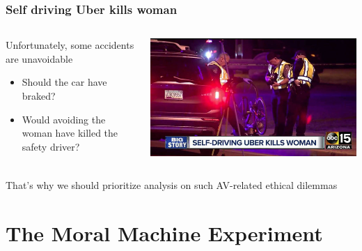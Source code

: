\documentclass[aspectratio=169]{beamer}
\begin{document}
\begin{frame}
    \frametitle{Self driving Uber kills woman}
    \begin{columns}[totalwidth=1.0\textwidth]
        \begin{column}{0.5\textwidth}
            Unfortunately, some accidents are unavoidable
            \begin{itemize}
                \item Should the car have braked?
                \item Would avoiding the woman have killed the safety driver?
            \end{itemize}
        \end{column}
        \begin{column}{0.45\textwidth}
            \includegraphics[width=1.0\linewidth]{assets/death-of-Elaine-Herzberg.jpg}
        \end{column}
    \end{columns}
    \bigskip
    \begin{center}
        That's why we should prioritize analysis on such AV-related ethical dilemmas
    \end{center}
\end{frame}

\section{The Moral Machine Experiment}
\end{document}
